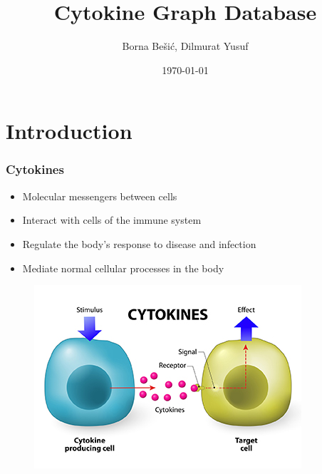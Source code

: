 \documentclass{beamer}
\title[Cytokine Graph DB]{ Cytokine Graph Database } %
\author{ Borna Bešić, Dilmurat Yusuf } %
\institute[] %
{
Bioinformatics Group \\
\medskip
Albert-Ludwigs-Universität, Freiburg  %
}
\date{\today} %
\begin{document}
\begin{frame}
\titlepage %
\end{frame}



\section{Introduction} %

\begin{frame}
\frametitle{Cytokines}
\begin{itemize}
    \item Molecular messengers between cells
    \item Interact with cells of the immune system
    \item Regulate the body's response to disease and infection
    \item Mediate normal cellular processes in the body
\end{itemize}
\begin{figure}
    \centering
    \includegraphics[width=0.5\linewidth]{cytokines.jpg}
\end{figure}
\end{frame}
\end{document}
